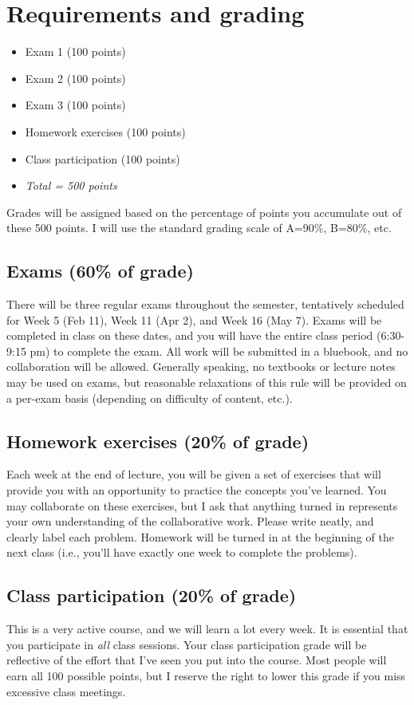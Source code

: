 \documentclass[10pt]{article}
\begin{document}
\section*{Requirements and grading}
\label{sec:org0577df2}
\begin{itemize}
\item Exam 1 (100 points)
\item Exam 2 (100 points)
\item Exam 3 (100 points)
\item Homework exercises (100 points)
\item Class participation (100 points)
\item \emph{Total = 500 points}
\end{itemize}

Grades will be assigned based on the percentage of points you accumulate out of these 500 points.  I will use the standard grading scale of A=90\%, B=80\%, etc.

\subsection*{Exams (60\% of grade)}
\label{sec:orge63b263}
There will be three regular exams throughout the semester, tentatively scheduled for Week 5 (Feb 11), Week 11 (Apr 2), and Week 16 (May 7). Exams will be completed in class on these dates, and you will have the entire class period (6:30-9:15 pm) to complete the exam. All work will be submitted in a bluebook, and no collaboration will be allowed. Generally speaking, no textbooks or lecture notes may be used on exams, but reasonable relaxations of this rule will be provided on a per-exam basis (depending on difficulty of content, etc.).

\subsection*{Homework exercises (20\% of grade)}
\label{sec:org319e5d7}
Each week at the end of lecture, you will be given a set of exercises that will provide you with an opportunity to practice the concepts you've learned. You may collaborate on these exercises, but I ask that anything turned in represents your own understanding of the collaborative work. Please write neatly, and clearly label each problem. Homework will be turned in at the beginning of the next class (i.e., you'll have exactly one week to complete the problems).

\subsection*{Class participation (20\% of grade)}
\label{sec:orgafd0655}
This is a very active course, and we will learn a lot every week. It is essential that you participate in \emph{all} class sessions. Your class participation grade will be reflective of the effort that I've seen you put into the course. Most people will earn all 100 possible points, but I reserve the right to lower this grade if you miss excessive class meetings. 
\end{document}
